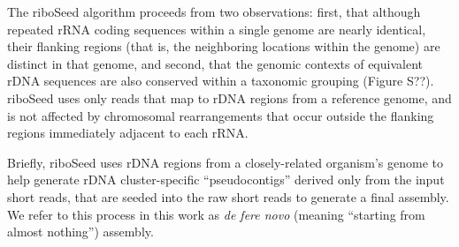 The riboSeed algorithm proceeds from two observations: first, that although repeated rRNA coding sequences within a single genome are nearly identical, their flanking regions (that is, the neighboring locations within the genome) are distinct in that genome, and second, that the genomic contexts of equivalent rDNA sequences are also conserved within a taxonomic grouping (Figure S??). riboSeed uses only reads that map to rDNA regions from a reference genome, and is not affected by chromosomal rearrangements that occur outside the flanking regions immediately adjacent to each rRNA.


Briefly, riboSeed uses rDNA regions from a closely-related organism's genome to help generate rDNA cluster-specific ``pseudocontigs'' derived only from the input short reads, that are seeded into the raw short reads to generate a final assembly. We refer to this process in this work as \textit{de fere novo} (meaning ``starting from almost nothing'') assembly.
